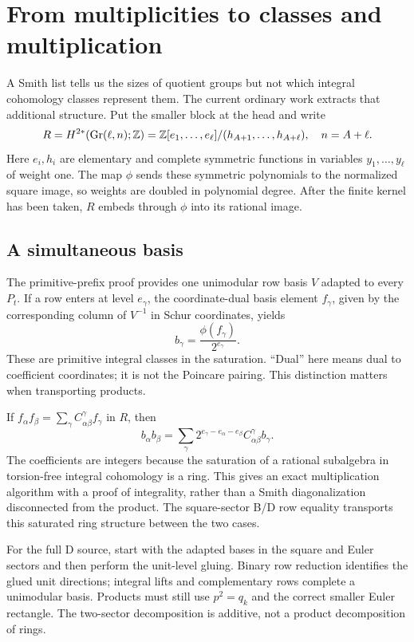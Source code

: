 \section{From multiplicities to classes and multiplication}
A Smith list tells us the sizes of quotient groups but not which integral cohomology classes represent them. The current ordinary work extracts that additional structure. Put the smaller block at the head and write
\[
 R=H^{2*}(\operatorname{Gr}(\ell,n);\mathbb Z)
 =\mathbb Z[e_1,\ldots,e_\ell]/(h_{A+1},\ldots,h_{A+\ell}),\quad n=A+\ell.
\]
Here $e_i,h_i$ are elementary and complete symmetric functions in variables $y_1,\ldots,y_\ell$ of weight one. The map $\phi$ sends these symmetric polynomials to the normalized square image, so weights are doubled in polynomial degree. After the finite kernel has been taken, $R$ embeds through $\phi$ into its rational image.

\subsection{A simultaneous basis}
The primitive-prefix proof provides one unimodular row basis $V$ adapted to every $P_t$. If a row enters at level $e_\gamma$, the coordinate-dual basis element $f_\gamma$, given by the corresponding column of $V^{-1}$ in Schur coordinates, yields
\[
 b_\gamma=\frac{\phi(f_\gamma)}{2^{e_\gamma}}.
\]
These are primitive integral classes in the saturation. ``Dual'' here means dual to coefficient coordinates; it is not the Poincare pairing. This distinction matters when transporting products.

If $f_\alpha f_\beta=\sum_\gamma C_{\alpha\beta}^\gamma f_\gamma$ in $R$, then
\[
 b_\alpha b_\beta
 =\sum_\gamma 2^{e_\gamma-e_\alpha-e_\beta}
 C_{\alpha\beta}^\gamma b_\gamma.
\]
The coefficients are integers because the saturation of a rational subalgebra in torsion-free integral cohomology is a ring. This gives an exact multiplication algorithm with a proof of integrality, rather than a Smith diagonalization disconnected from the product. The square-sector B/D row equality transports this saturated ring structure between the two cases.

For the full D source, start with the adapted bases in the square and Euler sectors and then perform the unit-level gluing. Binary row reduction identifies the glued unit directions; integral lifts and complementary rows complete a unimodular basis. Products must still use $p^2=q_k$ and the correct smaller Euler rectangle. The two-sector decomposition is additive, not a product decomposition of rings.

